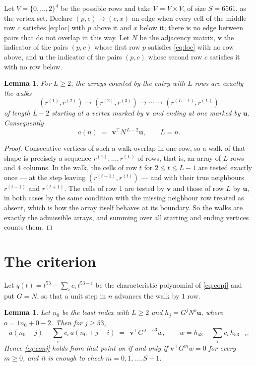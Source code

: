 \documentclass[11pt,a4paper]{article}
\theoremstyle{plain}
\newtheorem{lemma}[theorem]{Lemma}
\theoremstyle{definition}
\begin{document}
Let $V=\{0,\dots,2\}^{4}$ be the possible rows and take
$\mathcal V=V\times V$, of size $S=6561$, as the vertex set. Declare $(p,c)\to(c,x)$ an edge
when every cell of the middle row $c$ satisfies \eqref{eq:loc} with $p$ above it and $x$
below it; there is no edge between pairs that do not overlap in this way. Let $N$ be the
adjacency matrix, $\mathbf{v}$ the indicator of the pairs $(p,c)$ whose first row $p$
satisfies \eqref{eq:loc} with no row above, and $\mathbf{u}$ the indicator of
the pairs $(p,c)$ whose second row $c$ satisfies it with no row below.

\begin{lemma}\label{lem:walk}
For $L\ge2$, the arrays counted by the entry with $L$ rows are exactly the walks
\[
(r^{(1)},r^{(2)})\to(r^{(2)},r^{(3)})\to\cdots\to(r^{(L-1)},r^{(L)})
\]
of length $L-2$ starting at a vertex marked by $\mathbf{v}$ and ending at one marked by
$\mathbf{u}$. Consequently
\[
a(n)\;=\;\,\mathbf{v}^{\!\top}N^{\,L-2}\mathbf{u},\qquad L=n .
\]
\end{lemma}

\begin{proof}
Consecutive vertices of such a walk overlap in one row, so a walk of that shape is
precisely a sequence $r^{(1)},\dots,r^{(L)}$ of rows, that is, an array of $L$ rows
and $4$ columns. In the walk, the cells of row $t$ for $2\le t\le L-1$ are tested
exactly once --- at the step leaving $(r^{(t-1)},r^{(t)})$ --- and with their true
neighbours $r^{(t-1)}$ and $r^{(t+1)}$. The cells of row $1$ are tested by
$\mathbf{v}$ and those of row $L$ by $\mathbf{u}$, in both cases by the same condition
with the missing neighbour row treated as absent, which is how the array itself behaves at
its boundary. So the walks are exactly the admissible arrays, and summing over all starting
and ending vertices counts them.
\end{proof}

\section{The criterion}

Let $q(t)=t^{53}-\sum_i c_i\,t^{53-i}$ be the characteristic polynomial of
\eqref{eq:conj} and put $G=N$, so that a unit step in $n$ advances the walk by
$1$ row.

\begin{lemma}\label{lem:crit}
Let $n_0$ be the least index with $L\ge2$ and $h_j=G^{j}N^{o}\mathbf{u}$, where
$o=1n_0+0-2$. Then for $j\ge53$,
\[
a(n_0+j)-\sum_i c_i\,a(n_0+j-i)\;=\;\,\mathbf{v}^{\!\top}G^{\,j-53}w,
\qquad w=h_{53}-\sum_i c_i\,h_{53-i} .
\]
Hence \eqref{eq:conj} holds from that point on if and only if
$\mathbf{v}^{\!\top}G^{m}w=0$ for every $m\ge0$, and it is enough to check
$m=0,1,\dots,S-1$.
\end{lemma}
\end{document}
